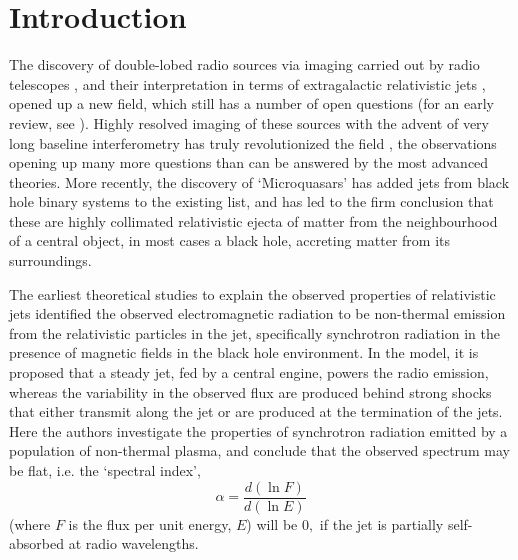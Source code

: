 \section{Introduction}

The discovery of double-lobed radio sources via imaging carried out by radio telescopes \citep{MacDonald_et_al.-1968-MNRAS,Mackay-1969-MNRAS,Branson_et_al.-1972-MNRAS,Hargrave-1974-MNRAS, Hargrave_&_Ryle-1974-MNRAS,Fanaroff_&_Riley-1974-MNRAS}, and their interpretation in terms of extragalactic relativistic jets \citep{Longair_et_al.-1973-MNRAS,Blandford_&_Rees-1974-MNRAS,Scheuer-1974-MNRAS}, opened up a new field, which still has a number of open questions (for an early review, see \citealt{Begelman_et_al.-1984-RevModPhys}). Highly resolved imaging of these sources with the advent of very long baseline interferometry has truly revolutionized the field \citep{Biretta_et_al.-1986-ApJ,Marscher-1988-ApJ,Reid_et_al.-1989-ApJ}, the observations opening up many more questions than can be answered by the most advanced theories. More recently, the discovery of `Microquasars' \citep{Mirabel_&_Rodriguez-1992-Nature,Mirabel_&_Rodriguez-1994-Nature,Mirabel_&_Rodriguez-1998-Nature} has added jets from black hole binary systems to the existing list, and has led to the firm conclusion that these are highly collimated relativistic \citep{Ryle_&_Longair-1967-MNRAS,Blandford_et_al.-1977-Nature} ejecta of matter from the neighbourhood of a central object, in most cases a black hole, accreting matter from its surroundings.

The earliest theoretical studies to explain the observed properties of relativistic jets \citep{Blandford_&_Rees-1974-MNRAS,Blandford_&_McKee-1976,Blandford_&_McKee-1977-MNRAS,Blandford_&_Konigl-1979-ApJ,Lind_&_Blandford-1985-ApJ} identified the observed electromagnetic radiation to be non-thermal emission from the relativistic particles in the jet, specifically synchrotron radiation in the presence of magnetic fields in the black hole environment. In the \citealt{Blandford_&_Konigl-1979-ApJ} model, it is proposed that a steady jet, fed by a central engine, powers the radio emission, whereas the variability in the observed flux are produced behind strong shocks that either transmit along the jet or are produced at the termination of the jets. Here the authors investigate the properties of synchrotron radiation emitted by a population of non-thermal plasma, and conclude that the observed spectrum may be flat, i.e. the `spectral index',
\begin{equation}
\alpha = \frac{d (\ln F)}{d (\ln E)}
\end{equation} (where $ F $ is the flux per unit energy, $ E $) will be $ 0 , $ if the jet is partially self-absorbed at radio wavelengths.

